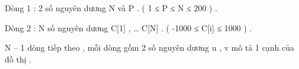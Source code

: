 Dòng 1 : 2 số nguyên dương N và P . ( 1 ≤ P ≤ N ≤ 200 ) .   


   Dòng 2 : N số nguyên dương C[1] , … C[N] . ( -1000 ≤ C[i] ≤ 1000 ) .   


   N – 1 dòng tiếp theo , mỗi dòng gồm 2 số nguyên dương u , v mô tả 1 cạnh của đồ thị .